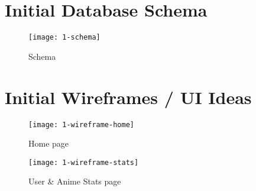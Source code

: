 \newpage
\section{Initial Database Schema}

\begin{figure}[H]
  \caption{Schema}
  \centering
  \texttt{[image: 1-schema]}
\end{figure}

\newpage
\section{Initial Wireframes / UI Ideas}

\begin{figure}[H]
  \caption{Home page}
  \centering
  \texttt{[image: 1-wireframe-home]}
\end{figure}

\begin{figure}[H]
  \caption{User \& Anime Stats page}
  \centering
  \texttt{[image: 1-wireframe-stats]}
\end{figure}
